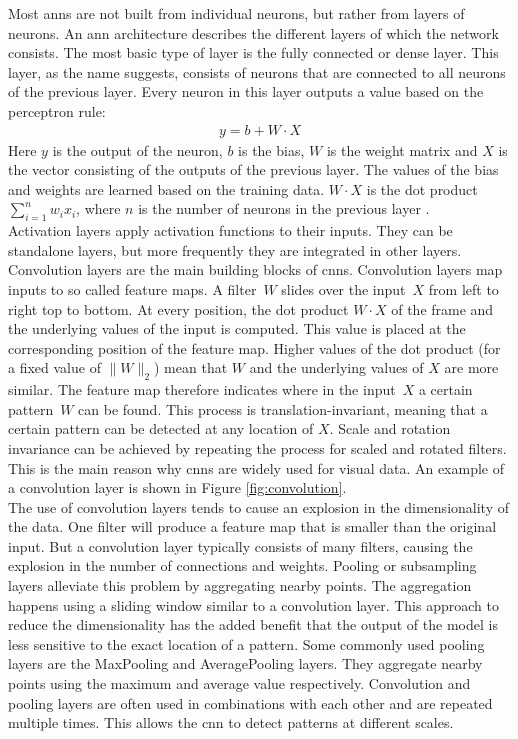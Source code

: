 Most \glspl{ann} are not built from individual neurons, but rather from layers of neurons. An \gls{ann} architecture describes the different layers of which the network consists. The most basic type of layer is the fully connected or dense layer. This layer, as the name suggests, consists of neurons that are connected to all neurons of the previous layer. Every neuron in this layer outputs a value based on the perceptron rule:
\begin{align*}
	y = b + W \cdot X
\end{align*} 
Here $y$ is the output of the neuron, $b$ is the bias, $W$ is the weight matrix and $X$ is the vector consisting of the outputs of the previous layer. The values of the bias and weights are learned based on the training data. $W \cdot X$ is the dot product $\sum_{i=1}^nw_ix_i$, where $n$ is the number of neurons in the previous layer \cite{perceptron_wikipedia}.\\

Activation layers apply activation functions to their inputs. They can be standalone layers, but more frequently they are integrated in other layers.\\ 

Convolution layers \cite{mnist} are the main building blocks of \glspl{cnn}. Convolution layers map inputs to so called feature maps. A filter~$W$ slides over the input~$X$ from left to right top to bottom. At every position, the dot product $W\cdot X$ of the frame and the underlying values of the input is computed. This value is placed at the corresponding position of the feature map. Higher values of the dot product (for a fixed value of $\|W\|_2$) mean that $W$ and the underlying values of $X$ are more similar. The feature map therefore indicates where in the input~$X$ a certain pattern~$W$ can be found. This process is translation-invariant, meaning that a certain pattern can be detected at any location of $X$. Scale and rotation invariance can be achieved by repeating the process for scaled and rotated filters. This is the main reason why \glspl{cnn} are widely used for visual data. An example of a convolution layer is shown in Figure \ref{fig:convolution}.\\

The use of convolution layers tends to cause an explosion in the dimensionality of the data. One filter will produce a feature map that is smaller than the original input. But a convolution layer typically consists of many filters, causing the explosion in the number of connections and weights. Pooling or subsampling layers \cite{mnist} alleviate this problem by aggregating nearby points. The aggregation happens using a sliding window similar to a convolution layer. This approach to reduce the dimensionality has the added benefit that the output of the model is less sensitive to the exact location of a pattern. Some commonly used pooling layers are the MaxPooling and AveragePooling layers. They aggregate nearby points using the maximum and average value respectively. Convolution and pooling layers are often used in combinations with each other and are repeated multiple times. This allows the \gls{cnn} to detect patterns at different scales.\\
 
